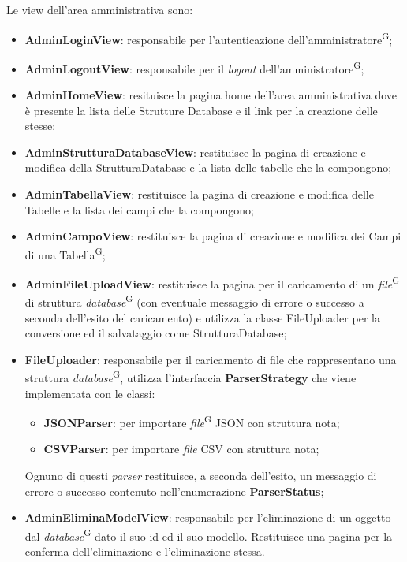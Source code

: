 \documentclass[5pt]{article}
\begin{document}
	
	Le view dell'area amministrativa sono:
	\begin{itemize}
		\item \textbf{AdminLoginView}: responsabile per l'autenticazione dell'amministratore\textsuperscript{G};
		\item \textbf{AdminLogoutView}: responsabile per il \textit{logout} dell'amministratore\textsuperscript{G};
		\item \textbf{AdminHomeView}: resituisce la pagina home dell'area amministrativa dove è presente la lista delle Strutture Database e il link per la creazione delle stesse;
		\item \textbf{AdminStrutturaDatabaseView}: restituisce la pagina di creazione e modifica della StrutturaDatabase e la lista delle tabelle che la compongono;
		\item \textbf{AdminTabellaView}: restituisce la pagina di creazione e modifica delle Tabelle e la lista dei campi che la compongono;
		\item \textbf{AdminCampoView}: restituisce la pagina di creazione e modifica dei Campi di una Tabella\textsuperscript{G};
		\item \textbf{AdminFileUploadView}: restituisce la pagina per il caricamento di un \textit{file}\textsuperscript{G} di struttura \textit{database}\textsuperscript{G} (con eventuale messaggio di errore o successo a seconda dell'esito del caricamento) e utilizza la classe FileUploader per la conversione ed il salvataggio come StrutturaDatabase;
		\item \textbf{FileUploader}: responsabile per il caricamento di file che rappresentano una struttura \textit{database}\textsuperscript{G}, utilizza l'interfaccia \textbf{ParserStrategy}  che viene implementata con le classi:
		\begin{itemize}
			\item \textbf{JSONParser}: per importare \textit{file}\textsuperscript{G} JSON con struttura nota;
			\item \textbf{CSVParser}: per importare \textit{file} CSV con struttura nota;
		\end{itemize}
		Ognuno di questi \textit{parser} restituisce, a seconda dell'esito, un messaggio di errore o successo contenuto nell'enumerazione \textbf{ParserStatus};
		\item \textbf{AdminEliminaModelView}: responsabile per l'eliminazione di un oggetto dal \textit{database}\textsuperscript{G} dato il suo id ed il suo modello. Restituisce una pagina per la conferma dell'eliminazione e l'eliminazione stessa.
	\end{itemize}
	
\end{document}
